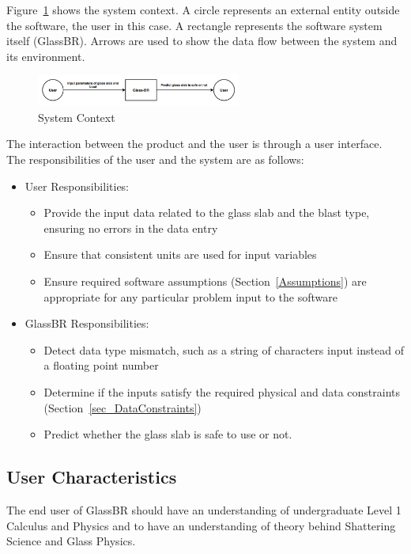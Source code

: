 \documentclass[12pt]{article}
\newcommand{\progname}{GlassBR}
\begin{document}
Figure~\ref{Fig_SystemContext} shows the system context.  A circle represents an
external entity outside the software, the user in this case.  A rectangle
represents the software system itself (\progname{}).  Arrows are used to show the data
flow between the system and its environment.

\begin{figure}[h!]
	\begin{center}
		\includegraphics[width=0.6\textwidth]{SystemContextFigure.png}
		\caption{System Context}
		\label{Fig_SystemContext} 
	\end{center}
\end{figure}

The interaction between the product and the user is through a user
interface.  The responsibilities of the user and the system are as follows:

\begin{itemize}
\item User Responsibilities:
  \begin{itemize}
  \item Provide the input data related to the glass slab and the blast type,
    ensuring no errors in the data entry
  \item Ensure that consistent units are used for input variables
  \item Ensure required software assumptions (Section~\ref{Assumptions}) are
    appropriate for any particular problem input to the software
  \end{itemize}
\item \progname{} Responsibilities:
  \begin{itemize}
  \item Detect data type mismatch, such as a string of characters input instead
    of a floating point number
  \item Determine if the inputs satisfy the required physical and data
    constraints (Section~\ref{sec_DataConstraints})
  \item Predict whether the glass slab is safe to use or not.
  \end{itemize}
\end{itemize}

\subsection{User Characteristics} 
\label{sec_userchar}
The end user of
\progname{} should have an understanding of undergraduate Level 1 Calculus
and Physics and to have an understanding of theory behind Shattering
Science and Glass Physics.
\end{document}
